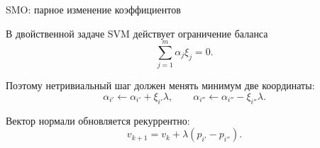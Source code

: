 \SPBGContentSlide
  {SMO: парное изменение коэффициентов}
  {%
    \FormulaBody
    В двойственной задаче SVM действует ограничение баланса
    \[
      \sum_{j=1}^{m}\alpha_j\xi_j=0.
    \]

    Поэтому нетривиальный шаг должен менять минимум две координаты:
    \[
      \alpha_{i'}\leftarrow \alpha_{i'}+\xi_{i'}\lambda,
      \qquad
      \alpha_{i''}\leftarrow \alpha_{i''}-\xi_{i''}\lambda.
    \]

    Вектор нормали обновляется рекуррентно:
    \[
      v_{k+1}=v_k+\lambda(p_{i'}-p_{i''}).
    \]
  }
